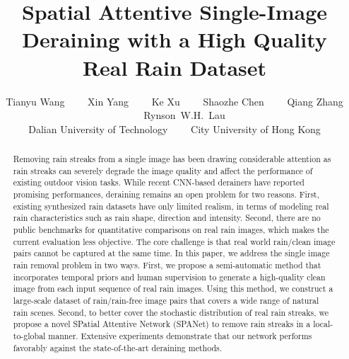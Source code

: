 \documentclass[10pt,twocolumn,letterpaper]{article}
\begin{document}
\title{Spatial Attentive Single-Image Deraining with a High Quality Real Rain Dataset
\vspace{-0.1in}}

\author{Tianyu Wang \ \ \ \ Xin Yang \ \ \ \ Ke Xu \ \ \ \ Shaozhe Chen \ \ \ \ Qiang Zhang \ \ \ \ Rynson~W.H.~Lau \\
Dalian University of Technology \ \ \ \ City University of Hong Kong\\


\vspace{-0.2in}
}







\maketitle
\thispagestyle{empty}

\begin{abstract}
Removing rain streaks from a single image has been drawing considerable attention as rain streaks can severely degrade the image quality and affect the performance of existing outdoor vision tasks.
While recent CNN-based derainers have reported promising performances, deraining remains an open problem for two reasons. First, existing synthesized rain datasets have only limited realism, in terms of modeling real rain characteristics such as rain shape, direction and intensity.
Second, there are no public benchmarks for quantitative comparisons on real rain images, which makes the current evaluation less objective. The core challenge is that real world rain/clean image pairs cannot be captured at the same time.
In this paper, we address the single image rain removal problem in two ways.
First, we propose a semi-automatic method that incorporates temporal priors and human supervision to generate a high-quality clean image from each input sequence of real rain images. Using this method,
we construct a large-scale dataset of  rain/rain-free image pairs that covers a wide range of natural rain scenes.
Second, to better cover the stochastic distribution of real rain streaks, we propose a novel SPatial Attentive Network (SPANet) to remove rain streaks in a local-to-global manner.
Extensive experiments demonstrate that our network performs favorably against the state-of-the-art deraining methods.
\vspace{-0.1in}


\end{abstract}
\end{document}

